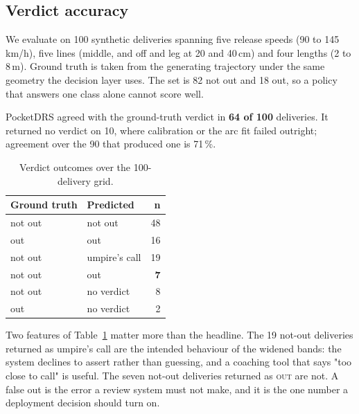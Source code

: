 %

\subsection{Verdict accuracy}
We evaluate on 100 synthetic deliveries spanning five release speeds (90 to 145\,km/h), five
lines (middle, and off and leg at 20 and 40\,cm) and four lengths (2 to 8\,m). Ground truth is
taken from the generating trajectory under the same geometry the decision layer uses. The set is
82 not out and 18 out, so a policy that answers one class alone cannot score well.

PocketDRS agreed with the ground-truth verdict in \textbf{64 of 100} deliveries. It returned no
verdict on 10, where calibration or the arc fit failed outright; agreement over the 90 that
produced one is 71\,\%.

\begin{table}[!t]
\caption{Verdict outcomes over the 100-delivery grid.}
\label{tab:wide}
\centering
\begin{tabular}{@{}llr@{}}
\toprule
\textbf{Ground truth} & \textbf{Predicted} & \textbf{n}\\
\midrule
not out & not out       & 48\\
out     & out           & 16\\
not out & umpire's call & 19\\
not out & out           & \textbf{7}\\
not out & no verdict    & 8\\
out     & no verdict    & 2\\
\bottomrule
\end{tabular}
\end{table}

Two features of Table~\ref{tab:wide} matter more than the headline. The 19 not-out deliveries
returned as umpire's call are the intended behaviour of the widened bands: the system declines to
assert rather than guessing, and a coaching tool that says "too close to call" is useful. The
seven not-out deliveries returned as \textsc{out} are not. A false out is the error a review
system must not make, and it is the one number a deployment decision should turn on.

